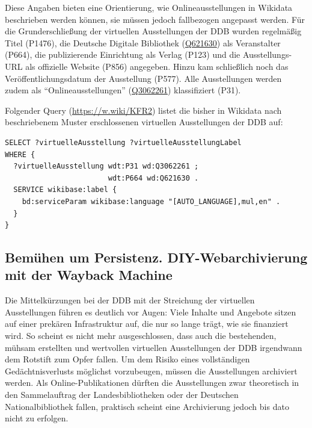 \documentclass[a4paper,
fontsize=11pt,
oneside,
numbers=noperiodatend,
parskip=half-,
bibliography=totoc,
final
]{scrartcl}
\begin{document}
Diese Angaben bieten eine Orientierung, wie Onlineausstellungen in
Wikidata beschrieben werden können, sie müssen jedoch fallbezogen
angepasst werden. Für die Grunderschließung der virtuellen Ausstellungen
der DDB wurden regelmäßig Titel (P1476), die Deutsche Digitale
Bibliothek (\href{http://www.wikidata.org/entity/Q621630}{Q621630}) als
Veranstalter (P664), die publizierende Einrichtung als Verlag (P123) und
die Ausstellungs-URL als offizielle Website (P856) angegeben. Hinzu kam
schließlich noch das Veröffentlichungsdatum der Ausstellung (P577). Alle
Ausstellungen werden zudem als \enquote{Onlineausstellungen}
(\href{http://www.wikidata.org/entity/Q3062261}{Q3062261}) klassifiziert
(P31).

Folgender Query (\url{https://w.wiki/KFR2}) listet die bisher in
Wikidata nach beschriebenem Muster erschlossenen virtuellen
Ausstellungen der DDB auf:

\begin{lstlisting}
SELECT ?virtuelleAusstellung ?virtuelleAusstellungLabel
WHERE {
  ?virtuelleAusstellung wdt:P31 wd:Q3062261 ;
                        wdt:P664 wd:Q621630 .
  SERVICE wikibase:label {
    bd:serviceParam wikibase:language "[AUTO_LANGUAGE],mul,en" .
  }
}
\end{lstlisting}

\hypertarget{bemuxfchen-um-persistenz.-diy-webarchivierung-mit-der-wayback-machine}{%
\subsection{Bemühen um Persistenz. DIY-Webarchivierung mit der Wayback
Machine}\label{bemuxfchen-um-persistenz.-diy-webarchivierung-mit-der-wayback-machine}}

Die Mittelkürzungen bei der DDB mit der Streichung der virtuellen
Ausstellungen führen es deutlich vor Augen: Viele Inhalte und Angebote
sitzen auf einer prekären Infrastruktur auf, die nur so lange trägt, wie
sie finanziert wird. So scheint es nicht mehr ausgeschlossen, dass auch
die bestehenden, mühsam erstellten und wertvollen virtuellen
Ausstellungen der DDB irgendwann dem Rotstift zum Opfer fallen. Um dem
Risiko eines vollständigen Gedächtnisverlusts möglichst vorzubeugen,
müssen die Ausstellungen archiviert werden. Als Online-Publikationen
dürften die Ausstellungen zwar theoretisch in den Sammelauftrag der
Landesbibliotheken oder der Deutschen Nationalbibliothek fallen,
praktisch scheint eine Archivierung jedoch bis dato nicht zu erfolgen.
\end{document}
